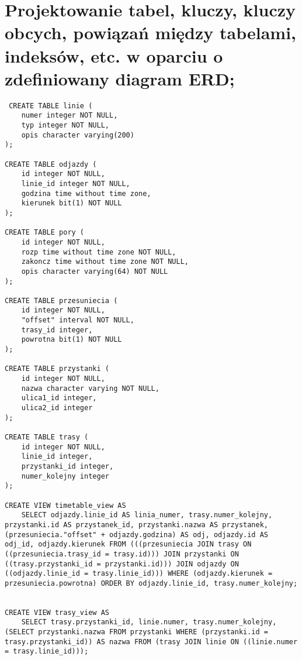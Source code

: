 \section{Projektowanie tabel, kluczy, kluczy obcych, powiązań między tabelami, indeksów, etc. w oparciu o zdefiniowany diagram ERD;} 



\begin{verbatim}
 CREATE TABLE linie (
    numer integer NOT NULL,
    typ integer NOT NULL,
    opis character varying(200)
);

CREATE TABLE odjazdy (
    id integer NOT NULL,
    linie_id integer NOT NULL,
    godzina time without time zone,
    kierunek bit(1) NOT NULL
);

CREATE TABLE pory (
    id integer NOT NULL,
    rozp time without time zone NOT NULL,
    zakoncz time without time zone NOT NULL,
    opis character varying(64) NOT NULL
);

CREATE TABLE przesuniecia (
    id integer NOT NULL,
    "offset" interval NOT NULL,
    trasy_id integer,
    powrotna bit(1) NOT NULL
);

CREATE TABLE przystanki (
    id integer NOT NULL,
    nazwa character varying NOT NULL,
    ulica1_id integer,
    ulica2_id integer
);

CREATE TABLE trasy (
    id integer NOT NULL,
    linie_id integer,
    przystanki_id integer,
    numer_kolejny integer
);

CREATE VIEW timetable_view AS
    SELECT odjazdy.linie_id AS linia_numer, trasy.numer_kolejny, przystanki.id AS przystanek_id, przystanki.nazwa AS przystanek, (przesuniecia."offset" + odjazdy.godzina) AS odj, odjazdy.id AS odj_id, odjazdy.kierunek FROM (((przesuniecia JOIN trasy ON ((przesuniecia.trasy_id = trasy.id))) JOIN przystanki ON ((trasy.przystanki_id = przystanki.id))) JOIN odjazdy ON ((odjazdy.linie_id = trasy.linie_id))) WHERE (odjazdy.kierunek = przesuniecia.powrotna) ORDER BY odjazdy.linie_id, trasy.numer_kolejny;


CREATE VIEW trasy_view AS
    SELECT trasy.przystanki_id, linie.numer, trasy.numer_kolejny, (SELECT przystanki.nazwa FROM przystanki WHERE (przystanki.id = trasy.przystanki_id)) AS nazwa FROM (trasy JOIN linie ON ((linie.numer = trasy.linie_id)));



\end{verbatim}

